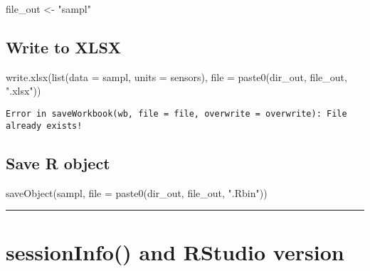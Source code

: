 \documentclass[
]{article}
\newenvironment{Shaded}{\begin{snugshade}}{\end{snugshade}}
\newcommand{\AttributeTok}[1]{\textcolor[rgb]{0.77,0.63,0.00}{#1}}
\newcommand{\FunctionTok}[1]{\textcolor[rgb]{0.00,0.00,0.00}{#1}}
\newcommand{\NormalTok}[1]{#1}
\newcommand{\OtherTok}[1]{\textcolor[rgb]{0.56,0.35,0.01}{#1}}
\newcommand{\StringTok}[1]{\textcolor[rgb]{0.31,0.60,0.02}{#1}}
\begin{document}
\begin{Shaded}
\begin{Highlighting}[]
\NormalTok{file\_out }\OtherTok{\textless{}{-}} \StringTok{"sampl"}
\end{Highlighting}
\end{Shaded}

\hypertarget{write-to-xlsx}{%
\subsection{Write to XLSX}\label{write-to-xlsx}}

\begin{Shaded}
\begin{Highlighting}[]
\FunctionTok{write.xlsx}\NormalTok{(}\FunctionTok{list}\NormalTok{(}\AttributeTok{data =}\NormalTok{ sampl, }\AttributeTok{units =}\NormalTok{ sensors), }\AttributeTok{file =} \FunctionTok{paste0}\NormalTok{(dir\_out, file\_out, }\StringTok{".xlsx"}\NormalTok{))}
\end{Highlighting}
\end{Shaded}

\begin{verbatim}
Error in saveWorkbook(wb, file = file, overwrite = overwrite): File already exists!
\end{verbatim}

\hypertarget{save-r-object}{%
\subsection{Save R object}\label{save-r-object}}

\begin{Shaded}
\begin{Highlighting}[]
\FunctionTok{saveObject}\NormalTok{(sampl, }\AttributeTok{file =} \FunctionTok{paste0}\NormalTok{(dir\_out, file\_out, }\StringTok{".Rbin"}\NormalTok{))}
\end{Highlighting}
\end{Shaded}

\begin{center}\rule{0.5\linewidth}{0.5pt}\end{center}

\hypertarget{sessioninfo-and-rstudio-version}{%
\section{sessionInfo() and RStudio
version}\label{sessioninfo-and-rstudio-version}}
\end{document}
